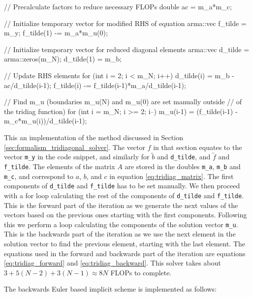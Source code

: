 \documentclass[reprint,english,notitlepage]{revtex4-1}  %
\begin{document}
\begin{cpp}
// Precalculate factors to reduce necessary FLOPs
double ac = m_a*m_c;

// Initialize temporary vector for modified RHS of equation
arma::vec f_tilde = m_y;
f_tilde(1) -= m_a*m_u(0);

// Initialize temporary vector for reduced diagonal elements
arma::vec d_tilde = arma::zeros(m_N);
d_tilde(1) = m_b;

// Update RHS elements
for (int i = 2; i < m_N; i++){
  d_tilde(i) = m_b - ac/d_tilde(i-1);
  f_tilde(i) -= f_tilde(i-1)*m_a/d_tilde(i-1);
}

// Find m_u (boundaries m_u(N) and m_u(0) are set manually outside
// of the tridiag function)
for (int i = m_N; i >= 2; i--){
  m_u(i-1) = (f_tilde(i-1) - m_c*m_u(i))/d_tilde(i-1);
}
\end{cpp} 

This an implementation of the method discussed in Section \ref{sec:formalism_tridiagonal_solver}. The vector $f$ in that section equates to the vector \verb+m_y+ in the code snippet, and similarly for $\tilde{b}$ and \verb+d_tilde+, and $\tilde{f}$ and \verb+f_tilde+. The elements of the matrix $A$ are stored in the doubles \verb+m_a+, \verb+m_b+ and \verb+m_c+, and correspond to $a$, $b$, and $c$ in equation \eqref{eq:tridiag_matrix}. The first components of \verb+d_tilde+ and \verb+f_tilde+ has to be set manually. We then proceed with a for loop calculating the rest of the components of \verb+d_tilde+ and \verb+f_tilde+. This is the forward part of the iteration as we generate the next values of the vectors based on the previous ones starting with the first components. Following this we perform a loop calculating the components of the solution vector \verb+m_u+. This is the backwards part of the iteration as we use the next element in the solution vector to find the previous element, starting with the last element. The equations used in the forward and backwards part of the iteration are equations \eqref{eq:tridiag_forward} and \eqref{eq:tridiag_backward}. This solver takes about $3 + 5(N-2) + 3(N-1) \approx 8N$ FLOPs to complete. 

The backwards Euler based implicit scheme is implemented as follows:

\begin{cpp}
// Iterate over timesteps
for (int j = 1; j <= m_M; j++){
  // Use tridiagonal solver to move one step
  tridiag();

  // Set boundary conditions
  m_u(0) = m_lb;
  m_u(m_N) = m_ub;

  // Update previous solution
  m_y = m_u;
  }
}
\end{cpp}  
\end{document}
